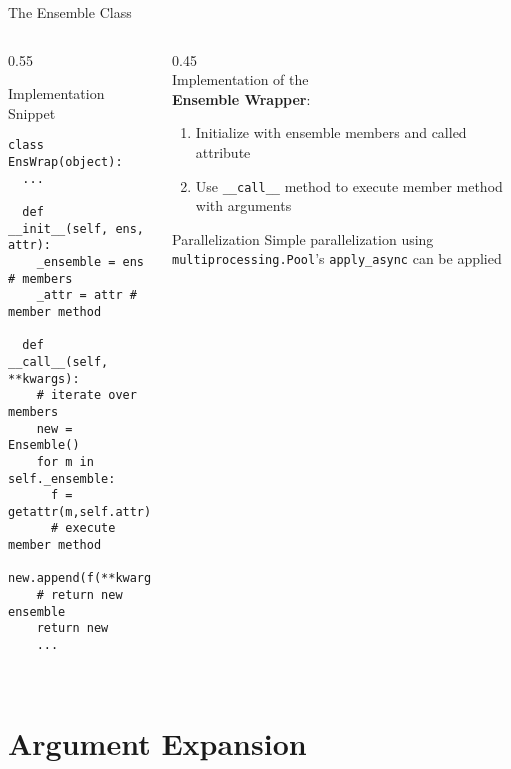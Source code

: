 \documentclass[hyperref={pdfpagelabels=false},compress,final]{beamer}
\newenvironment{myBox}[3][shadow=true]%
{\begin{center} \begin{minipage}{#2} \begin{beamerboxesrounded}[#1]{#3} \smallskip}%
      {\smallskip \end{beamerboxesrounded} \end{minipage} \end{center}}
\newenvironment{myGreenBox}[3][upper=upgreen,lower=lowgreen,shadow=true]%
{\begin{center} \begin{minipage}{#2} \begin{beamerboxesrounded}[#1]{#3} \smallskip}%
      {\smallskip \end{beamerboxesrounded} \end{minipage} \end{center}}
\begin{document}
\begin{frame}[fragile=singleslide]{\hspace*{0.65\textwidth}The Ensemble Class}
  \begin{columns}
    \begin{column}{0.55\textwidth}
      \vspace*{-1.cm}
      \begin{myBox}{1.\textwidth}{Implementation Snippet}
        \small
        \begin{verbatim}
class EnsWrap(object):
  ...
  
  def __init__(self, ens, attr):
    _ensemble = ens # members
    _attr = attr # member method
      
  def __call__(self, **kwargs):
    # iterate over members
    new = Ensemble()
    for m in self._ensemble:
      f = getattr(m,self.attr)
      # execute member method
      new.append(f(**kwargs))      
    # return new ensemble
    return new
    ...
    
        \end{verbatim}
      \end{myBox}
    \end{column}
    \begin{column}{0.45\textwidth}
      \medskip \\
      { \large Implementation of the \\ \smallskip \textbf{\color{darkred} Ensemble Wrapper}:} \\ 
      \small
      \begin{enumerate}
        \item Initialize with ensemble members and called attribute \medskip
        \item Use \texttt{\_\_call\_\_} method to execute member method with arguments
      \end{enumerate}
      \begin{myGreenBox}{0.95\textwidth}{Parallelization}
        Simple parallelization using \texttt{multiprocessing.Pool}'s \texttt{apply\_async} can be applied
       \end{myGreenBox}
    \end{column}
  \end{columns}
\end{frame}





\section{Argument Expansion}
\end{document}

